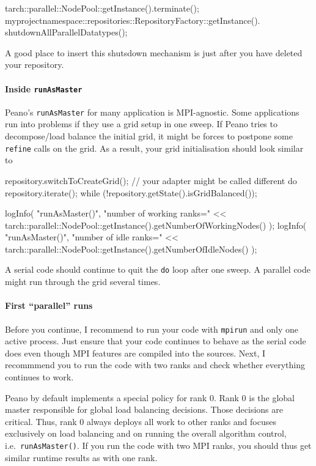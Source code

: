 \begin{code}
tarch::parallel::NodePool::getInstance().terminate();
myprojectnamespace::repositories::RepositoryFactory::getInstance().
  shutdownAllParallelDatatypes();
\end{code}

\noindent
A good place to insert this shutsdown mechanism is just after you have deleted
your repository.


\paragraph{Inside \texttt{runAsMaster}}
Peano's \texttt{runAsMaster} for many application is MPI-agnostic.
Some applications run into problems if they use a grid setup in one sweep.
If Peano tries to decompose/load balance the initial grid, it might be forces to
postpone some \texttt{refine} calls on the grid. 
As a result, your grid initialisation should look similar to
\begin{code}
repository.switchToCreateGrid(); // your adapter might be called different
do {
  repository.iterate();
} while (!repository.getState().isGridBalanced());

logInfo(
  "runAsMaster()",
  "number of working ranks=" << 
  tarch::parallel::NodePool::getInstance().getNumberOfWorkingNodes() 
);
logInfo(
  "runAsMaster()",
  "number of idle ranks=" << tarch::parallel::NodePool::getInstance().getNumberOfIdleNodes()
);
\end{code}

\noindent
A serial code should continue to quit the \texttt{do} loop after one sweep. 
A parallel code might run through the grid several times.


\paragraph{First ``parallel'' runs}
Before you continue, I recommend to run your code with \texttt{mpirun} and only
one active process. 
Just ensure that your code continues to behave as the serial code does even
though MPI features are compiled into the sources.
Next, I recommmend you to run the code with two ranks and check whether
everything continues to work.

\begin{remark}
Peano by default implements a special policy for rank 0. Rank 0 is the global
master responsible for global load balancing decisions. Those decisions are
critical. 
Thus, rank 0 always deploys all work to other ranks and focuses exclusively on
load balancing and on running the overall algorithm control,
i.e.~\texttt{runAsMaster()}.
If you run the code with two MPI ranks, you should thus get similar runtime
results as with one rank.
\end{remark}
 
